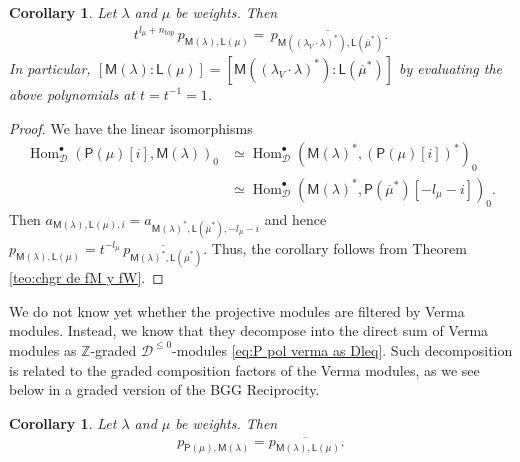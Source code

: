 \documentclass[reqno]{amsart}
\renewcommand{\_}[1]{_{\left( #1 \right)}}
\renewcommand{\^}[1]{^{\left( #1 \right)}}
\newcommand\fL{\mathsf{L}}
\newcommand\fM{\mathsf{M}}
\newcommand\fP{\mathsf{P}}
\newcommand{\Z}{{\mathbb Z}}
\newcommand{\D}{\mathcal{D}}
\newcommand\Hom{\operatorname{Hom}}
\theoremstyle{plain}
\newtheorem{cor}[lema]{Corollary}
\theoremstyle{definition}
\theoremstyle{remark}
\begin{document}
\begin{cor}\label{cor:fMlambda fLmu}
Let $\lambda$ and $\mu$ be weights. Then
\begin{align*}
t^{l_\mu+n_{top}}\,p_{\fM(\lambda),\fL(\mu)}=\,\overline{p_{\fM\left((\lambda_V\cdot\lambda)^*\right),\fL(\overline{\mu}^*)}}.
\end{align*}
In particular, $[\fM(\lambda):\fL(\mu)]=[\fM\left((\lambda_V\cdot\lambda)^*\right):\fL(\overline{\mu}^*)]$ by evaluating the above polynomials at $t=t^{-1}=1$.
\end{cor}

\begin{proof}
We have the linear isomorphisms
\begin{align*}
\Hom^\bullet_{\D}(\fP(\mu)[i],\fM(\lambda))_0
&\simeq\Hom^\bullet_{\D}(\fM(\lambda)^*,(\fP(\mu)[i])^*)_0\\
&\simeq\Hom^\bullet_{\D}(\fM(\lambda)^*,\fP\left(\overline{\mu}^*\right)[-l_\mu-i])_0.
\end{align*}
Then $a_{\fM(\lambda),\fL(\mu),i}=a_{\fM(\lambda)^*,\fL(\overline{\mu}^*),-l_{\mu}-i}$ and hence 
$p_{\fM(\lambda),\fL(\mu)}=t^{-l_\mu}\,\overline{p_{\fM(\lambda)^*,\fL(\overline{\mu}^*)}}$. Thus, the corollary follows from Theorem \ref{teo:chgr de fM y fW}.
\end{proof}

We do not know yet whether the projective modules are filtered by Verma modules. Instead, we know that they decompose into the direct sum of Verma modules as $\Z$-graded $\D^{\leq0}$-modules \eqref{eq:P pol verma as Dleq}. Such decomposition is related to the graded composition factors of the Verma modules, as we see below in a graded version of the BGG Reciprocity.

\begin{cor}\label{cor:almost BGG}
Let $\lambda$ and $\mu$ be weights. Then
\begin{align*}
p_{\fP(\mu),\fM(\lambda)}=\overline{p_{\fM(\lambda),\fL(\mu)}}.
\end{align*}
\end{cor}
\end{document}
